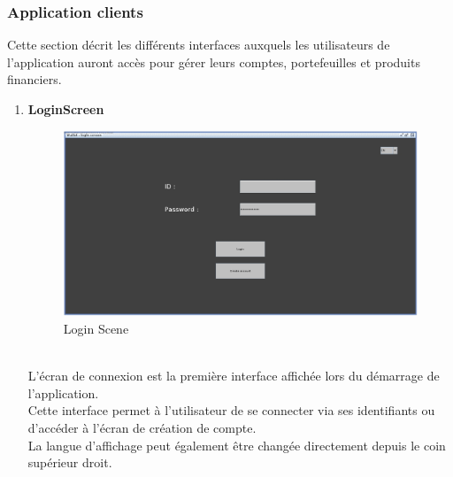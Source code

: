 \documentclass[../rapport.tex]{subfiles}
\begin{document}
\subsubsection{Application clients}
Cette section décrit les différents interfaces auxquels les utilisateurs de l'application auront accès pour gérer leurs comptes, portefeuilles et produits financiers.\\

\begin{enumerate}
\item \textbf{LoginScreen} \\
		\begin{figure}[h!]
				\centering \includegraphics[scale=0.2]{ressources/photos_diagrammes/app1/gui/login.jpg}
				\caption{Login Scene}
		\end{figure}
		\\
L'écran de connexion est la première interface affichée lors du démarrage de l'application.\\
Cette interface permet à l'utilisateur de se connecter via ses identifiants ou d'accéder à l'écran de création de compte.\\
La langue d'affichage peut également être changée directement depuis le coin supérieur droit.


\end{enumerate}
\end{document}
